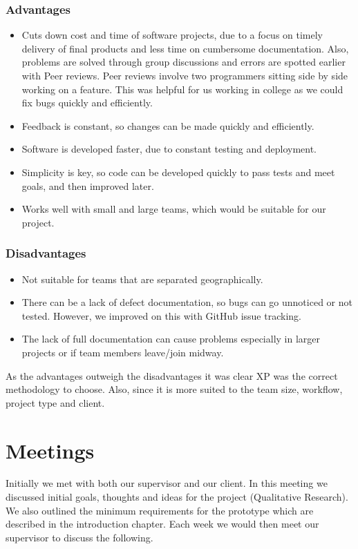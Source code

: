 \subsubsection{Advantages}
\begin{itemize}
  \item Cuts down cost and time of software projects, due to a focus on timely delivery of final products and less time on cumbersome documentation. Also, problems are solved through group discussions and errors are spotted earlier with Peer reviews. Peer reviews involve two programmers sitting side by side working on a feature. This was helpful for us working in college as we could fix bugs quickly and efficiently.
  \item Feedback is constant, so changes can be made quickly and efficiently.
  \item Software is developed faster, due to constant testing and deployment.
  \item Simplicity is key, so code can be developed quickly to pass tests and meet goals, and then improved later.
  \item Works well with small and large teams, which would be suitable for our project.
\end{itemize}

\subsubsection{Disadvantages}
\begin{itemize}
  \item Not suitable for teams that are separated geographically.
  \item There can be a lack of defect documentation, so bugs can go unnoticed or not tested. However, we improved on this with GitHub issue tracking.
  \item The lack of full documentation can cause problems especially in larger projects or if team members leave/join midway.
\end{itemize}

As the advantages outweigh the disadvantages it was clear XP was the correct methodology to choose. Also, since it is more suited to the team size, workflow, project type and client.

\section{Meetings}
Initially we met with both our supervisor and our client. In this meeting we discussed initial goals, thoughts and ideas for the project (Qualitative Research). We also outlined the minimum requirements for the prototype which are described in the introduction chapter. Each week we would then meet our supervisor to discuss the following.

